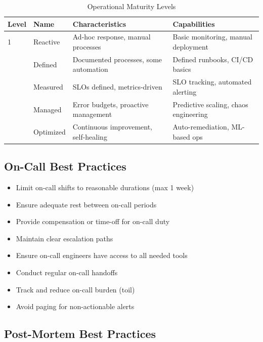 \documentclass[11pt,letterpaper]{article}
\begin{document}
\begin{table}[H]
\centering
\caption{Operational Maturity Levels}
\small
\begin{tabular}{@{}C{1.2cm}L{2.5cm}L{5cm}L{4.5cm}@{}}
\toprule
\textbf{Level} & \textbf{Name} & \textbf{Characteristics} & \textbf{Capabilities} \\
 & Reactive & Ad-hoc response, manual processes & Basic monitoring, manual deployment \\
 & Defined & Documented processes, some automation & Defined runbooks, CI/CD basics \\
 & Measured & SLOs defined, metrics-driven & SLO tracking, automated alerting \\
 & Managed & Error budgets, proactive management & Predictive scaling, chaos engineering \\
 & Optimized & Continuous improvement, self-healing & Auto-remediation, ML-based ops \\
\bottomrule
\end{tabular}
\end{table}

\subsection{On-Call Best Practices}

\begin{criticalbox}
\begin{itemize}[nosep]
    \item Limit on-call shifts to reasonable durations (max 1 week)
    \item Ensure adequate rest between on-call periods
    \item Provide compensation or time-off for on-call duty
    \item Maintain clear escalation paths
    \item Ensure on-call engineers have access to all needed tools
    \item Conduct regular on-call handoffs
    \item Track and reduce on-call burden (toil)
    \item Avoid paging for non-actionable alerts
\end{itemize}
\end{criticalbox}

\subsection{Post-Mortem Best Practices}
\end{document}
